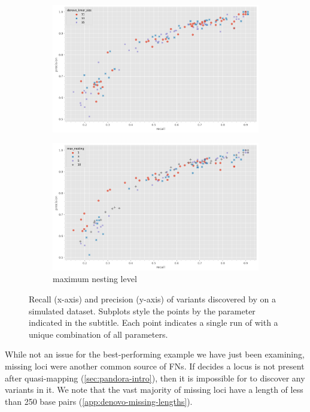 \begin{figure}
\begin{subfigure}[b]{0.475\textwidth}
        \includegraphics[width=1\linewidth]{Chapter1/Figs/denovo_precrec_kmer.png}
     \end{subfigure}
     \begin{subfigure}[b]{0.475\textwidth}
         \centering
         \caption[position=above]{\prg{} maximum nesting level}
         \label{fig:denovo-sims-nesting}
        \includegraphics[width=1\linewidth]{Chapter1/Figs/denovo_precrec_nesting.png}
     \end{subfigure}
    \caption{Recall (x-axis) and precision (y-axis) of \denovo{} variants discovered by \pandora{} on a simulated dataset. Subplots style the points by the parameter indicated in the subtitle. Each point indicates a single run of \pandora{} with a unique combination of all parameters.}
        \label{fig:denovo-sims}
\end{figure}

While not an issue for the best-performing example we have just been examining, missing loci were another common source of FNs. If \pandora{} decides a locus is not present after quasi-mapping (\autoref{sec:pandora-intro}), then it is impossible for \denovo{} to discover any variants in it. We note that the vast majority of missing loci have a length of less than 250 base pairs (\autoref{app:denovo-missing-lengths}).

